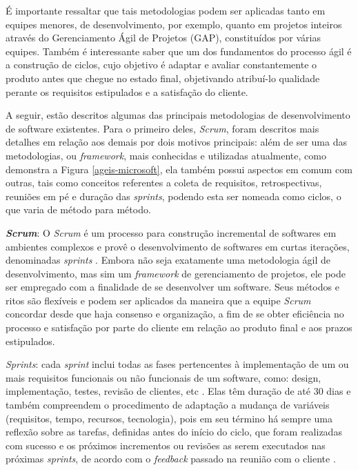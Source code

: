 É importante ressaltar que tais metodologias podem ser aplicadas tanto em equipes menores, de desenvolvimento, por exemplo, quanto em projetos inteiros através do Gerenciamento Ágil de Projetos (GAP), constituídos por várias equipes. Também é interessante saber que um dos fundamentos do processo ágil é a construção de ciclos, cujo objetivo é adaptar e avaliar constantemente o produto antes que chegue no estado final, objetivando atribuí-lo qualidade perante os requisitos estipulados e a satisfação do cliente.

A seguir, estão descritos algumas das principais metodologias de desenvolvimento de software existentes. Para o primeiro deles, \textit{Scrum}, foram descritos mais detalhes em relação aos demais por dois motivos principais: além de ser uma das metodologias, ou \textit{framework}, mais conhecidas e utilizadas atualmente, como demonstra a Figura \ref{ageis-microsoft}, ela também possui aspectos em comum com outras, tais como conceitos referentes a coleta de requisitos, retrospectivas, reuniões em pé e duração das \textit{sprints}, podendo esta ser nomeada como ciclos, o que varia de método para método.


\textbf{\textit{Scrum}}: O \textit{Scrum} é um processo para construção incremental de softwares em ambientes complexos e provê o desenvolvimento de softwares em curtas iterações, denominadas \textit{sprints} \cite{rising2000scrum}. Embora não seja exatamente uma metodologia ágil de desenvolvimento, mas sim um \textit{framework} de gerenciamento de projetos, ele pode ser empregado com a finalidade de se desenvolver um software. Seus métodos e ritos são flexíveis e podem ser aplicados da maneira que a equipe \textit{Scrum} concordar desde que haja consenso e organização, a fim de se obter eficiência no processo e satisfação por parte do cliente em relação ao produto final e aos prazos estipulados.

\textit{Sprints}: cada \textit{sprint} inclui todas as fases pertencentes à implementação de um ou mais requisitos funcionais ou não funcionais de um software, como: design, implementação, testes, revisão de clientes, etc \cite[~p. 2, tradução nossa]{matharu2015empirical}. Elas têm duração de até 30 dias e também compreendem o procedimento de adaptação a mudança de variáveis (requisitos, tempo, recursos, tecnologia), pois em seu término há sempre uma reflexão sobre as tarefas, definidas antes do início do ciclo, que foram realizadas com sucesso e os próximos incrementos ou revisões as serem executados nas próximas \textit{sprints}, de acordo com o \textit{feedback} passado na reunião com o cliente . 

